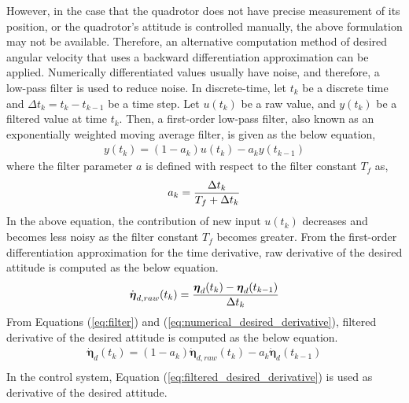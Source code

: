 However, in the case that the quadrotor does not have precise measurement of its position, or the quadrotor's attitude is controlled manually, the above formulation may not be available. Therefore, an alternative computation method of desired angular velocity that uses a backward differentiation approximation can be applied. Numerically differentiated values usually have noise, and therefore, a low-pass filter is used to reduce noise. In discrete-time, let \(t_k\) be a discrete time and \({\Delta t}_k = t_k - t_{k-1}\) be a time step. Let \(u(t_k)\) be a raw value, and \(y(t_k)\) be a filtered value at time \(t_k\). Then, a first-order low-pass filter, also known as an exponentially weighted moving average filter, is given as the below equation, 
\begin{equation}
\label{eq:filter}
\begin{aligned}
y (t_{k}) = (1- a_k) u (t_{k}) - a_k y (t_{k-1})
\end{aligned}
\end{equation}
where the filter parameter \(a\) is defined with respect to the filter constant \(T_f\) as,
\begin{equation}
\begin{aligned}
a_k = {{{\Delta t}_k}\over{T_f + {\Delta t}_k}}
\end{aligned}
\end{equation}
In the above equation, the contribution of new input \(u (t_{k}) \) decreases and becomes less noisy as the filter constant \(T_f\) becomes greater. From the first-order differentiation approximation for the time derivative, raw derivative of the desired attitude is computed as the below equation.\\
\begin{equation}
\label{eq:numerical_desired_derivative}
\begin{aligned}
{\dot {\boldsymbol \eta}_{d,raw}}  (t_{k}) = {{{\boldsymbol \eta}_d (t_{k}) - {\boldsymbol \eta}_d (t_{k-1}) }\over {{\Delta t}_k}}
\end{aligned}
\end{equation}
From Equations (\ref{eq:filter}) and (\ref{eq:numerical_desired_derivative}), filtered derivative of the desired attitude is computed as the below equation.\\
\begin{equation}
\label{eq:filtered_desired_derivative}
\begin{aligned}
{\dot {\boldsymbol \eta}_d} (t_{k}) = (1- a_k ){\dot {\boldsymbol \eta}_{d,raw}} (t_{k})  - a_k {\dot {\boldsymbol \eta}_d} (t_{k-1})\\
\end{aligned}
\end{equation}
In the control system, Equation (\ref{eq:filtered_desired_derivative}) is used as derivative of the desired attitude.


